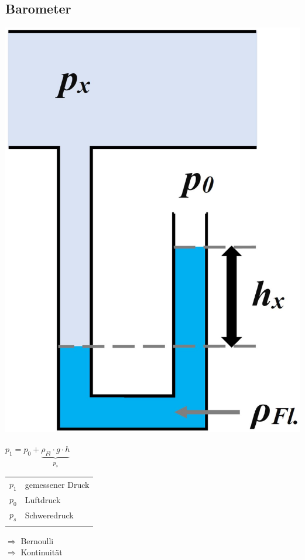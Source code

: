 \subsection{Barometer}
\begin{minipage}{0.4\linewidth}
\includegraphics[width=\linewidth]{Bilder/manometer} \\
\end{minipage}
\hfill
\begin{minipage}{0.5\linewidth}
$\boxed{ p_1 = p_0 + \underbrace{ \rho_{Fl} \cdot g \cdot h}_{\substack{p_s}} }$
 
 
\begin{tabular}{ll}
\\
$p_1$ & gemessener Druck \\
$p_0$ & Luftdruck \\
$p_s$ & Schweredruck \\
\\
\end{tabular}

$\Rightarrow$ Bernoulli \\
$\Rightarrow$ Kontinuität \\
\\
\\
\\
\\
\\
\end{minipage}




